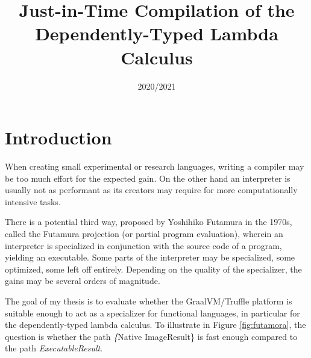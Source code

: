\documentclass{SPFIT}
\affiliation{\href{mailto:xzaryb00@stud.fit.vut.cz}{xzaryb00@stud.fit.vut.cz}, \textit{Faculty of Information Technology, Brno University of Technology}}
\date{2020/2021}
\title{Just-in-Time Compilation of the Dependently-Typed Lambda Calculus}
\begin{document}
\PPFinalCopy
\def\myauthor{Jakub Zárybnický}
\def\myabstract{%
When building a programming language, the choice is often between writing a compiler
or an interpreter, a compromise between speed and ease of implementation respectively.
Just-in-time compilation offers a compromise, interpretation combined with
gradual optimization during program runtime.
%
The goal of my goal is to investigate whether just-in-time compilation offers the
same advantages in the dependently-typed lambda calculus just as it does in imperative languages.
%
The implementation environment is the Java Virtual Machine, and in particular
the GraalVM runtime and the Truffle language implementation framework.

In the scope of this term project, I have investigated the relevant
topics of JIT compilation, dependent types, and lambda calculi. I have also
created a reference implementation of the dependently-typed lambda calculus
LambdaPi based on prior work, and started two other implementations---one
a LLVM-based compiler, and a Truffle-based JIT interpreter/compiler.

These three implementations---together with a set of benchmarks---will form
the basis of my thesis and after omtimizations, will either prove or disprove
the usefulness of JIT compilation for the dependently-typed lambda calculus.
}
\startdocument

\section{Introduction}
\label{sec:orgb69e573}
When creating small experimental or research languages, writing a compiler may
be too much effort for the expected gain. On the other hand an interpreter is
usually not as performant as its creators may require for more computationally
intensive tasks.

There is a potential third way, proposed by Yoshihiko Futamura in the 1970s,
called the Futamura projection (or partial program evaluation), wherein an
interpreter is specialized in conjunction with the source code of a program,
yielding an executable. Some parts of the interpreter may be specialized, some
optimized, some left off entirely. Depending on the quality of the specializer,
the gains may be several orders of magnitude.

The goal of my thesis is to evaluate whether the GraalVM/Truffle platform is
suitable enough to act as a specializer for functional languages, in particular
for the dependently-typed lambda calculus.  To illustrate in Figure
\ref{fig:futamora}, the question is whether the path \textit\{Native
Image\textrightarrow Result\} is fast enough compared to the path
\textit{Executable\textrightarrow Result}.
\end{document}
